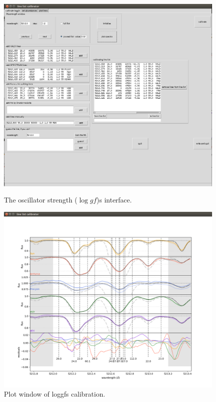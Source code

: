 \documentclass[a4paper,10pt]{article}
\newcommand\loggf{$\log gf$}
\begin{document}
\begin{figure}[h]
\begin{minipage}[t]{14cm}
\centering
\includegraphics[width=12cm]{pics/calibrate_loggfs.png}
\caption{The oscillator strength (\loggf)s interface.}
\label{calibrate_loggfs}
\end{minipage}
\vskip 1cm
\begin{minipage}[t]{14cm}

\centering
\includegraphics[width=12cm]{pics/plot_loggfs.png}
\caption{Plot window of loggfs calibration.}
\label{plot_loggfs}
\end{minipage}
\end{figure}
\end{document}

